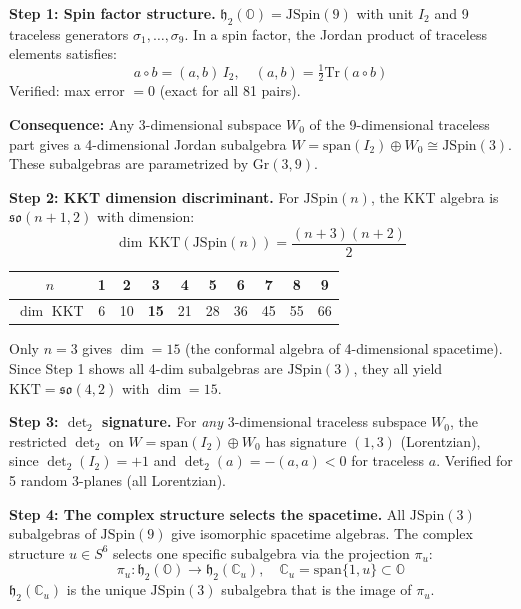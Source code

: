 \textbf{Step 1: Spin factor structure.}
$\mathfrak{h}_2(\mathbb{O}) = \mathrm{JSpin}(9)$ with unit $I_2$ and 9
traceless generators $\sigma_1, \ldots, \sigma_9$. In a spin factor, the
Jordan product of traceless elements satisfies:
\begin{equation}
  a \circ b = (a, b) \, I_2, \quad (a, b) = \tfrac{1}{2} \mathrm{Tr}(a \circ b)
\end{equation}
Verified: max error $= 0$ (exact for all 81 pairs).

\textbf{Consequence:} Any 3-dimensional subspace $W_0$ of the 9-dimensional
traceless part gives a 4-dimensional Jordan subalgebra
$W = \mathrm{span}(I_2) \oplus W_0 \cong \mathrm{JSpin}(3)$.
These subalgebras are parametrized by $\mathrm{Gr}(3,9)$.

\textbf{Step 2: KKT dimension discriminant.}
For $\mathrm{JSpin}(n)$, the KKT algebra is $\mathfrak{so}(n+1,2)$ with
dimension:
\begin{equation}
  \dim\, \mathrm{KKT}(\mathrm{JSpin}(n)) = \frac{(n+3)(n+2)}{2}
\end{equation}

\begin{center}
\begin{tabular}{c|ccccccccc}
  $n$ & 1 & 2 & 3 & 4 & 5 & 6 & 7 & 8 & 9 \\
  \hline
  $\dim$ KKT & 6 & 10 & \textbf{15} & 21 & 28 & 36 & 45 & 55 & 66
\end{tabular}
\end{center}

Only $n = 3$ gives $\dim = 15$ (the conformal algebra of 4-dimensional spacetime).
Since Step 1 shows all 4-dim subalgebras are $\mathrm{JSpin}(3)$, they all yield
$\mathrm{KKT} = \mathfrak{so}(4,2)$ with $\dim = 15$.

\textbf{Step 3: $\det_2$ signature.}
For \emph{any} 3-dimensional traceless subspace $W_0$, the restricted
$\det_2$ on $W = \mathrm{span}(I_2) \oplus W_0$ has signature $(1,3)$
(Lorentzian), since $\det_2(I_2) = +1$ and $\det_2(a) = -(a,a) < 0$ for
traceless $a$. Verified for 5 random 3-planes (all Lorentzian).

\textbf{Step 4: The complex structure selects the spacetime.}
All $\mathrm{JSpin}(3)$ subalgebras of $\mathrm{JSpin}(9)$ give isomorphic
spacetime algebras. The complex structure $u \in S^6$ selects one specific
subalgebra via the projection $\pi_u$:
\begin{equation}
  \pi_u : \mathfrak{h}_2(\mathbb{O}) \to \mathfrak{h}_2(\mathbb{C}_u), \quad
  \mathbb{C}_u = \mathrm{span}\{1, u\} \subset \mathbb{O}
\end{equation}
$\mathfrak{h}_2(\mathbb{C}_u)$ is the unique $\mathrm{JSpin}(3)$ subalgebra
that is the image of $\pi_u$.

